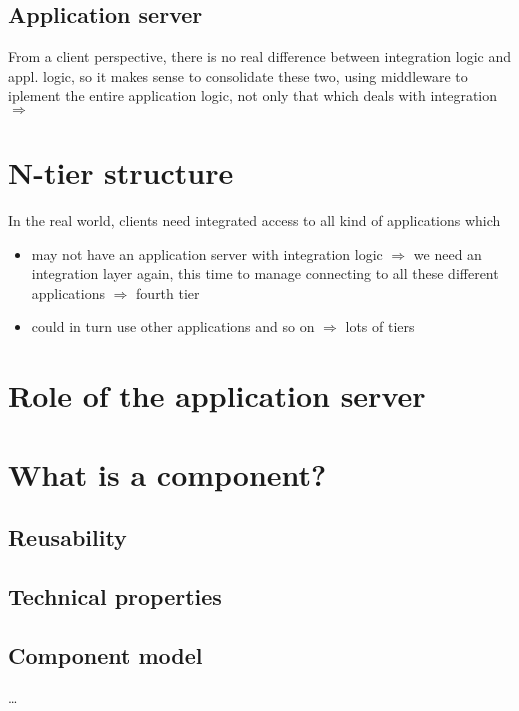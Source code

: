 		\subsection{Application server}
			From a client perspective, there is no real difference between integration logic and appl. logic, so it makes sense to consolidate these two, using middleware to iplement the entire application logic, not only that which deals with integration $\Rightarrow $ \textbf{}			
		
	\pagebreak %
		
	\section{N-tier structure}
		In the real world,  clients need integrated access to all kind of applications which
		\begin{itemize}
			\item may not have an application server with integration logic $ \Rightarrow $ we need an integration layer again, this time to manage connecting to all these different applications $ \Rightarrow $ fourth tier
			\item could in turn use other applications and so on $ \Rightarrow $ lots of tiers
		\end{itemize}
		
		
		
		
		
	\section{Role of the application server}
		
		
	\section{What is a component?}
		\subsection{Reusability}
		
		\subsection{Technical properties}
			
		\subsection{Component model}
			\ldots\\\\
	
